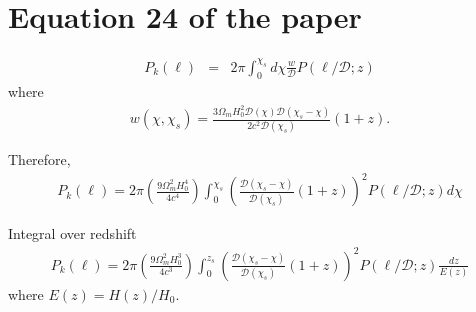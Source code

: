 \documentclass[12pt,a4paper]{article}
\begin{document}
\section{Equation 24 of the paper}
\begin{eqnarray}
P_k(\ell) &=& 2 \pi \int_0^{\chi_s} d\chi \frac{w}{\mathcal{D}} P (\ell/\mathcal{D}; z)
\end{eqnarray}
where 
\begin{eqnarray}
w(\chi, \chi_s) = \frac{3 \Omega_m H_0^2 \mathcal{D}(\chi) \mathcal{D}(\chi_s - \chi)}{2 c^2 \mathcal{D}(\chi_s)} (1 + z).
\end{eqnarray}

Therefore,
\begin{eqnarray}
P_k(\ell) = 2 \pi \left(\frac{9 \Omega_m^2 H_0^4 }{4 c^4 } \right)
\int_0^{\chi_s}  \left( \frac{ \mathcal{D}(\chi_s - \chi)}{ \mathcal{D}(\chi_s)} (1 + z) \right)^2  P(\ell/\mathcal{D};z) d\chi
\end{eqnarray}

Integral over redshift
\begin{eqnarray}
P_k(\ell) = 2 \pi \left(\frac{9 \Omega_m^2 H_0^3 }{4 c^3 } \right)
\int_0^{z_s}  \left( \frac{ \mathcal{D}(\chi_s - \chi)}{ \mathcal{D}(\chi_s)} (1 + z) \right)^2  P(\ell/\mathcal{D};z) \frac{dz}{E(z)}
\end{eqnarray}
where $ E(z)  = H(z)/H_0$.
\end{document}
